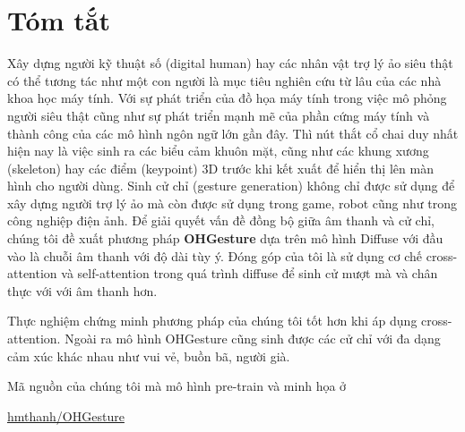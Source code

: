 \chapter*{Tóm tắt}
\label{abstract}

Xây dựng người kỹ thuật số (digital human) hay các nhân vật trợ lý ảo siêu thật có thể tương tác như một con người là mục tiêu nghiên cứu từ lâu của các nhà khoa học máy tính. Với sự phát triển của đồ họa máy tính trong việc mô phỏng người siêu thật cũng như sự phát triển mạnh mẽ của phần cứng máy tính và thành công của các mô hình ngôn ngữ lớn gần đây.
Thì nút thắt cổ chai duy nhất hiện nay là việc sinh ra các biểu cảm khuôn mặt, cũng như các khung xương (skeleton) hay các điểm (keypoint) 3D trước khi kết xuất để hiển thị lên màn hình cho người dùng.
Sinh cử chỉ (gesture generation) không chỉ được sử dụng để xây dựng người trợ lý ảo mà còn được sử dụng trong game, robot cũng như trong công nghiệp điện ảnh.
Để giải quyết vấn đề đồng bộ giữa âm thanh và cử chỉ, chúng tôi đề xuất phương pháp \textbf{OHGesture} dựa trên mô hình Diffuse với đầu vào là chuỗi âm thanh với độ dài tùy ý.
Đóng góp của tôi là sử dụng cơ chế cross-attention và self-attention trong quá trình diffuse để sinh cử mượt mà và chân thực với với âm thanh hơn.

Thực nghiệm chứng minh phương pháp của chúng tôi tốt hơn khi áp dụng cross-attention. Ngoài ra mô hình OHGesture cũng sinh được các cử chỉ với đa dạng cảm xúc khác nhau như vui vẻ, buồn bã, người già.



Mã nguồn của chúng tôi mà mô hình pre-train và minh họa ở

\href{https://github.com/hmthanh/OHGesture}{hmthanh/OHGesture}